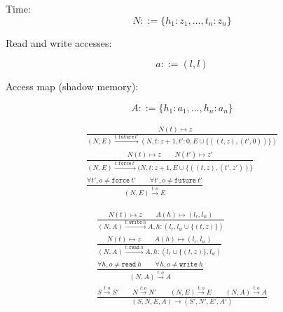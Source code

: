 \documentclass{article}
\newcommand{\TName}{t}
\newcommand{\TNamey}{t'}
\newcommand{\HName}{h}
\newcommand{\State}{S}
\newcommand{\reduces}[1][]{\xrightarrow{{#1}}}
\newcommand{\Op}{o}
\newcommand{\Nat}{z}
\newcommand{\Naty}{z'}
\newcommand{\Edges}{E}
\newcommand{\Access}{a}
\newcommand{\Nodes}{l}
\newcommand{\AccessMap}{A}
\newcommand{\Time}{N}
\newcommand{\Grmeq}{::=}
\newcommand{\OP}[2][\TName]{{#1}:{#2}}
\newcommand{\WRITE}[1]{\mathtt{write}\ {#1}}
\newcommand{\READ}[1]{\mathtt{read}\ {#1}}
\newcommand{\FUTURE}[1]{\mathtt{future}\ {#1}}
\newcommand{\FORCE}[1]{\mathtt{force}\ {#1}}
\begin{document}
Time:
$$
\Time \Grmeq \{ \HName_1 \colon \Nat_1, \dots, \TName_n\colon \Nat_n\}
$$



Read and write accesses:

$$
\Access \Grmeq (\Nodes,\Nodes)
$$

Access map (shadow memory):

$$
\AccessMap \Grmeq \{ \HName_1\colon \Access_1,\dots,\HName_n\colon\Access_n\}
$$

\begin{gather*}  
\frac{
  \Time(\TName) \mapsto \Nat
  \qquad
}{
  (\Time, \Edges)
  \reduces[{\OP{\FUTURE \TNamey}}] 
  (\Time, \TName \colon \Nat + 1, \TNamey \colon 0, \Edges \cup \{((\TName,\Nat),(\TNamey,0))\})
}
\\
\frac{
  \Time(\TName) \mapsto \Nat
  \qquad
  \Time(\TNamey) \mapsto \Naty
}{
  (\Time, \Edges)
  \reduces[{\OP{\FORCE \TNamey}}]
  (\Time, \TName \colon \Nat + 1, \Edges \cup \{((\TName,\Nat),(\TNamey,\Naty))\}
}
\\
\frac{
  \forall \TNamey, \Op \neq \FORCE \TNamey
  \qquad
  \forall \TNamey, \Op \neq \FUTURE \TNamey
}{
  (\Time, \Edges) \reduces[{\OP{\Op}}] \Edges
}
\end{gather*}

\begin{gather*}
\frac{
  \Time(\TName) \mapsto \Nat
  \qquad
  \AccessMap(\HName) \mapsto (\Nodes_r,\Nodes_w)
}{
  (\Time, \AccessMap) \reduces[{\OP{\WRITE \HName}}] \AccessMap, \HName \colon (\Nodes_r,\Nodes_w \cup \{(\TName,\Nat)\})
}
\\
\frac{
  \Time(\TName) \mapsto \Nat
  \qquad
  \AccessMap(\HName) \mapsto (\Nodes_r,\Nodes_w)
}{
  (\Time, \AccessMap) \reduces[{\OP{\READ \HName}}] \AccessMap, \HName \colon (\Nodes_r\cup \{(\TName,\Nat)\},\Nodes_w )
}
\\
\frac{
  \forall \HName, \Op \neq \READ \HName
  \qquad
  \forall \HName, \Op \neq \WRITE \HName
}{
  (\Time, \AccessMap) \reduces[{\OP{\Op}}] \AccessMap
}
\\
\frac{
  \State \reduces[{\OP{\Op}}] \State'
  \qquad
  \Time \reduces[{\OP{\Op}}] \Time'
  \qquad
  (\Time, \Edges) \reduces[{\OP{\Op}}] \Edges
  \qquad
  (\Time, \AccessMap) \reduces[{\OP{\Op}}] \AccessMap
}{
  (\State,\Time,\Edges,\AccessMap)
  \reduces
  (\State',\Time',\Edges',\AccessMap')
}
\end{gather*}
\end{document}
